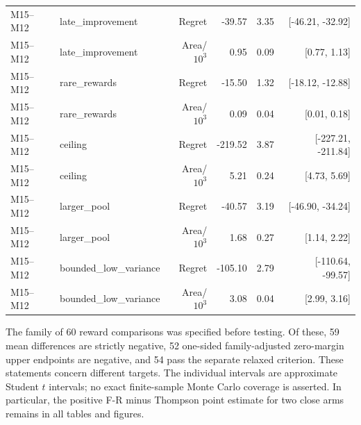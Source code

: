 \documentclass[11pt]{article}
\theoremstyle{remark}
\begin{document}
\begin{longtable}{llrrrr}
M15--M12 & late\_improvement & Regret & -39.57 & 3.35 & [-46.21, -32.92] \\
M15--M12 & late\_improvement & Area/$10^3$ & 0.95 & 0.09 & [0.77, 1.13] \\
M15--M12 & rare\_rewards & Regret & -15.50 & 1.32 & [-18.12, -12.88] \\
M15--M12 & rare\_rewards & Area/$10^3$ & 0.09 & 0.04 & [0.01, 0.18] \\
M15--M12 & ceiling & Regret & -219.52 & 3.87 & [-227.21, -211.84] \\
M15--M12 & ceiling & Area/$10^3$ & 5.21 & 0.24 & [4.73, 5.69] \\
M15--M12 & larger\_pool & Regret & -40.57 & 3.19 & [-46.90, -34.24] \\
M15--M12 & larger\_pool & Area/$10^3$ & 1.68 & 0.27 & [1.14, 2.22] \\
M15--M12 & bounded\_low\_variance & Regret & -105.10 & 2.79 & [-110.64, -99.57] \\
M15--M12 & bounded\_low\_variance & Area/$10^3$ & 3.08 & 0.04 & [2.99, 3.16] \\
\end{longtable}
\endgroup

The family of 60 reward comparisons was specified before testing. Of these, 59 mean differences are strictly negative, 52 one-sided family-adjusted zero-margin upper endpoints are negative, and 54 pass the separate relaxed criterion. These statements concern different targets. The individual intervals are approximate Student $t$ intervals; no exact finite-sample Monte Carlo coverage is asserted. In particular, the positive F-R minus Thompson point estimate for two close arms remains in all tables and figures.
\end{document}
